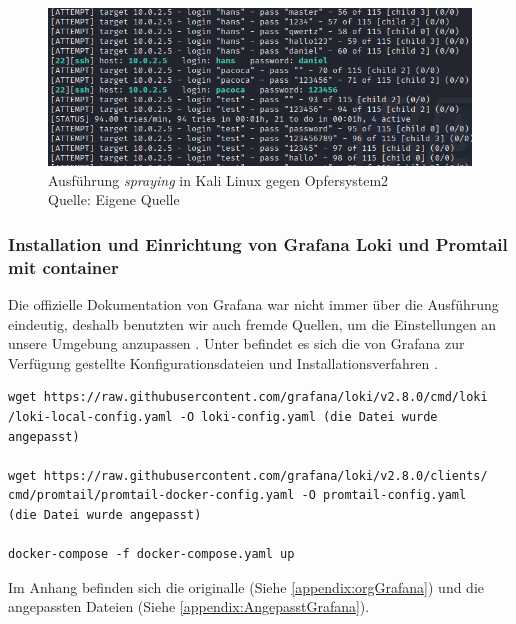 \begin{figure}[H]
   \centering
   \includegraphics[width=1\textwidth]{assets/Spraying_Kali2.png}
   \caption{Ausführung \textit{\gls{spraying}} in Kali Linux gegen Opfersystem2\\Quelle: Eigene Quelle}
   \centering
\end{figure}

\newpage
\subsubsection{Installation und Einrichtung von Grafana Loki und Promtail mit \gls{container}}
Die offizielle Dokumentation von Grafana war nicht immer über die Ausführung eindeutig, deshalb benutzten wir auch fremde Quellen, um die Einstellungen an unsere Umgebung anzupassen \citep{Polinowski_PGL}. Unter befindet es sich die von Grafana zur Verfügung gestellte Konfigurationsdateien und Installationsverfahren \citep{GrafanaLoki_run}. 

{
\begin{Verbatim}[frame=single]
wget https://raw.githubusercontent.com/grafana/loki/v2.8.0/cmd/loki
/loki-local-config.yaml -O loki-config.yaml (die Datei wurde angepasst)

wget https://raw.githubusercontent.com/grafana/loki/v2.8.0/clients/
cmd/promtail/promtail-docker-config.yaml -O promtail-config.yaml 
(die Datei wurde angepasst)

docker-compose -f docker-compose.yaml up 
\end{Verbatim}
}


Im Anhang befinden sich die originalle (Siehe \ref{appendix:orgGrafana}) und die angepassten Dateien (Siehe \ref{appendix:AngepasstGrafana}).

